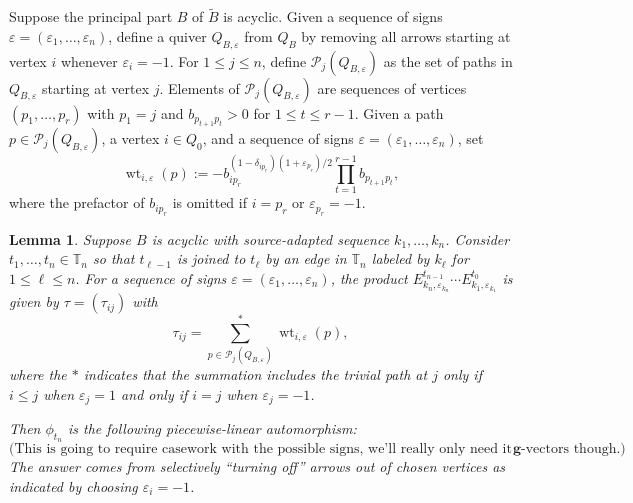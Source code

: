 \documentclass{amsart}
\newtheorem{lemma}[theorem]{Lemma}
\numberwithin{theorem}{section}
\newcommand{\bfg}{\boldsymbol{g}}
\newcommand{\cP}{\mathcal{P}}
\newcommand{\TT}{\mathbb{T}}
\newcommand{\wt}{{\operatorname{wt}}}
\begin{document}
  Suppose the principal part $B$ of $\tilde{B}$ is acyclic.
  Given a sequence of signs $\varepsilon=(\varepsilon_1,\ldots,\varepsilon_n)$, define a quiver $Q_{B,\varepsilon}$ from $Q_B$ by removing all arrows starting at vertex $i$ whenever $\varepsilon_i=-1$.
  For $1\le j\le n$, define $\cP_j(Q_{B,\varepsilon})$ as the set of paths in $Q_{B,\varepsilon}$ starting at vertex $j$.
  Elements of $\cP_j(Q_{B,\varepsilon})$ are sequences of vertices $(p_1,\ldots,p_r)$ with $p_1=j$ and $b_{p_{t+1}p_t}>0$ for $1\le t\le r-1$.
  Given a path $p\in\cP_j(Q_{B,\varepsilon})$, a vertex $i\in Q_0$, and a sequence of signs $\varepsilon=(\varepsilon_1,\ldots,\varepsilon_n)$, set
  \[
    \wt_{i,\varepsilon}(p):=-b_{ip_r}^{(1-\delta_{ip_r})(1+\varepsilon_{p_r})/2}\prod_{t=1}^{r-1} b_{p_{t+1}p_t},
  \]
  where the prefactor of $b_{ip_r}$ is omitted if $i=p_r$ or $\varepsilon_{p_r}=-1$.
  \begin{lemma}
    Suppose $B$ is acyclic with source-adapted sequence $k_1,\ldots,k_n$.
    Consider $t_1,\ldots,t_n\in\TT_n$ so that $t_{\ell-1}$ is joined to $t_\ell$ by an edge in $\TT_n$ labeled by $k_\ell$ for $1\le\ell\le n$.
    For a sequence of signs $\varepsilon=(\varepsilon_1,\ldots,\varepsilon_n)$, the product $E^{t_{n-1}}_{k_n,\varepsilon_{k_n}}\cdots E^{t_0}_{k_1,\varepsilon_{k_1}}$ is given by $\tau=(\tau_{ij})$ with
    \begin{equation}
      \label{eq:tropical twist}
      \tau_{ij}=\sum_{p\in\cP_j(Q_{B,\varepsilon})}^* \wt_{i,\varepsilon}(p),
    \end{equation}
    where the $*$ indicates that the summation includes the trivial path at $j$ only if $i\le j$ when $\varepsilon_j=1$ and only if $i=j$ when $\varepsilon_j=-1$.

    Then $\phi_{t_n}$ is the following piecewise-linear automorphism:
    \begin{equation}
      \label{eq:tropical twist}
      \text{(This is going to require casework with the possible signs, we'll really only need it for imaginary $\bfg$-vectors though.)}
    \end{equation}
    The answer comes from selectively ``turning off'' arrows out of chosen vertices as indicated by choosing $\varepsilon_i=-1$.
  \end{lemma}
\end{document}
